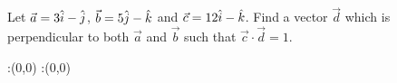 


\question Let $\vec{a}=3\hat{i}-\hat{j}$, $\vec{b}=5\hat{j}-\hat{k}$ 
and $\vec{c}=12\hat{i}-\hat{k}$. Find a vector $\vec{d}$ which is perpendicular
to both $\vec{a}$ and $\vec{b}$ such that $\vec{c}\cdot\vec{d}=1$.

\insertQR{}

\watchout

\ifprintanswers
  \begin{marginfigure}
      :(0,0)
      :(0,0)
    \figdrawbegin{}
      \figdrawline [100,101]
    \figdrawend
    \figvisu{\figBoxA}{}{%
    }
    \centerline{\box\figBoxA}
  \end{marginfigure}
\fi 

